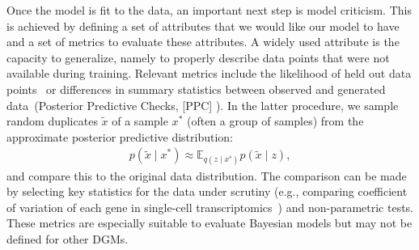 Once the model is fit to the data, an important next step is model criticism. This is achieved by defining a set of attributes that we would like our model to have and a set of metrics to evaluate these attributes. A widely used attribute is the capacity to generalize, namely to properly describe data points that were not available during training. Relevant metrics include the likelihood of held out data points~\cite{wallach2009evaluation} or differences in summary statistics between observed and generated data~(Posterior Predictive Checks, [PPC] \cite{rubin1984bayesianly}). In the latter procedure, we sample random duplicates $\tilde{x}$ of a sample $x^*$ (often a group of samples) from the approximate posterior predictive distribution:
\begin{align}
    p(\tilde{x} \mid x^*) \approx \mathbb{E}_{q(z \mid  x^*)}p(\tilde{x} \mid z),
\end{align}
and compare this to the original data distribution. The comparison can be made by selecting key statistics for the data under scrutiny (e.g., comparing coefficient of variation of each gene in single-cell transcriptomics~\cite{Levitin2019}) and non-parametric tests. These metrics are especially suitable to evaluate Bayesian models but may not be defined for other DGMs.



